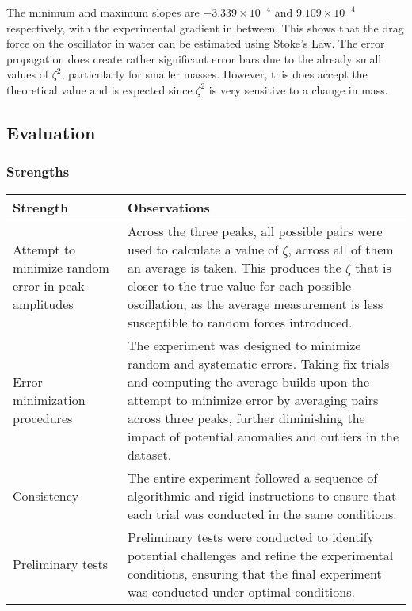 \documentclass[a4paper,12pt]{article}
\newcommand{\thcolor}{\cellcolor{Blue!25}}
\begin{document}
The minimum and maximum slopes are $-3.339\times 10^{-4}$ and $9.109\times 10^{-4}$ respectively, with the experimental gradient in between. This shows that the drag force on the oscillator in water can be estimated using Stoke's Law. The error propagation does create rather significant error bars due to the already small values of $\zeta^2$, particularly for smaller masses. However, this does accept the theoretical value and is expected since $\zeta^2$ is very sensitive to a change in mass.

\subsection{Evaluation}

\subsubsection{Strengths}

\begin{center}
  \begin{tabular}{|p{}|p{}|}
    \hline
    \thcolor Strength                                   & \thcolor Observations                                                                                                                                                                                                                                                                                          \\ \hline
    Attempt to minimize random error in peak amplitudes & Across the three peaks, all possible pairs were used to calculate a value of $\zeta$, across all of them an average is taken. This produces the $\overline{\zeta}$ that is closer to the true value for each possible oscillation, as the average measurement is less susceptible to random forces introduced. \\ \hline
    Error minimization procedures                       & The experiment was designed to minimize random and systematic errors. Taking fix trials and computing the average builds upon the attempt to minimize error by averaging pairs across three peaks, further diminishing the impact of potential anomalies and outliers in the dataset.                          \\ \hline
    Consistency                                         & The entire experiment followed a sequence of algorithmic and rigid instructions to ensure that each trial was conducted in the same conditions.                                                                                                                                                                \\ \hline
    Preliminary tests                                   & Preliminary tests were conducted to identify potential challenges and refine the experimental conditions, ensuring that the final experiment was conducted under optimal conditions.                                                                                                                           \\ \hline
  \end{tabular}
\end{center}
\end{document}
